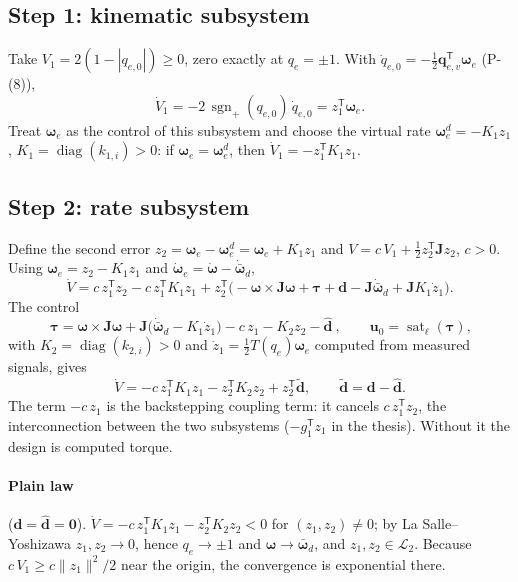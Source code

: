 \documentclass[11pt]{article}
\newcommand{\T}{^{\mathsf T}}
\newcommand{\sat}{\operatorname{sat}}
\newcommand{\sgnp}{\operatorname{sgn}_{+}}
\newcommand{\Peq}[1]{P-(#1)}
\theoremstyle{remark}
\begin{document}
\subsection{Step 1: kinematic subsystem}
Take $V_1=2(1-|q_{e,0}|)\ge0$, zero exactly at $q_e=\pm1$. With $\dot q_{e,0}=-\frac12\bm q_{e,v}\T\bm\omega_e$ (\Peq{8}),
\[
\dot V_1=-2\,\sgnp(q_{e,0})\,\dot q_{e,0}=z_1\T\bm\omega_e .
\]
Treat $\bm\omega_e$ as the control of this subsystem and choose the virtual rate $\bm\omega_e^d=-K_1z_1$, $K_1=\operatorname{diag}(k_{1,i})>0$:
if $\bm\omega_e=\bm\omega_e^d$, then $\dot V_1=-z_1\T K_1z_1$.

\subsection{Step 2: rate subsystem}
Define the second error $z_2=\bm\omega_e-\bm\omega_e^d=\bm\omega_e+K_1z_1$ and $V=c\,V_1+\frac12z_2\T\bm Jz_2$, $c>0$. Using
$\bm\omega_e=z_2-K_1z_1$ and $\dot{\bm\omega}_e=\dot{\bm\omega}-\dot{\bar{\bm\omega}}_d$,
\[
\dot V=c\,z_1\T z_2-c\,z_1\T K_1z_1+z_2\T\big(-\bm\omega\times\bm J\bm\omega+\bm\tau+\bm d-\bm J\dot{\bar{\bm\omega}}_d+\bm JK_1\dot z_1\big).
\]
The control
\begin{equation}
\boxed{\ \bm\tau=\bm\omega\times\bm J\bm\omega+\bm J\big(\dot{\bar{\bm\omega}}_d-K_1\dot z_1\big)-c\,z_1-K_2z_2-\hat{\bm d}\ },\qquad
\bm u_0=\sat_{\bm\ell}(\bm\tau),
\label{eq:bstrue}
\end{equation}
with $K_2=\operatorname{diag}(k_{2,i})>0$ and $\dot z_1=\frac12T(q_e)\bm\omega_e$ computed from measured signals, gives
\begin{equation}
\dot V=-c\,z_1\T K_1z_1-z_2\T K_2z_2+z_2\T\tilde{\bm d},\qquad \tilde{\bm d}=\bm d-\hat{\bm d}.
\label{eq:vdot}
\end{equation}
The term $-c\,z_1$ is the backstepping coupling term: it cancels $c\,z_1\T z_2$, the interconnection between the two
subsystems ($-g_1\T z_1$ in the thesis). Without it the design is computed torque.

\paragraph{Plain law} ($\bm d=\hat{\bm d}=\bm0$). $\dot V=-c\,z_1\T K_1z_1-z_2\T K_2z_2<0$ for $(z_1,z_2)\ne0$; by La Salle--Yoshizawa
$z_1,z_2\to0$, hence $q_e\to\pm1$ and $\bm\omega\to\bar{\bm\omega}_d$, and $z_1,z_2\in\mathcal L_2$. Because
$c\,V_1\ge c\|z_1\|^2/2$ near the origin, the convergence is exponential there.
\end{document}

